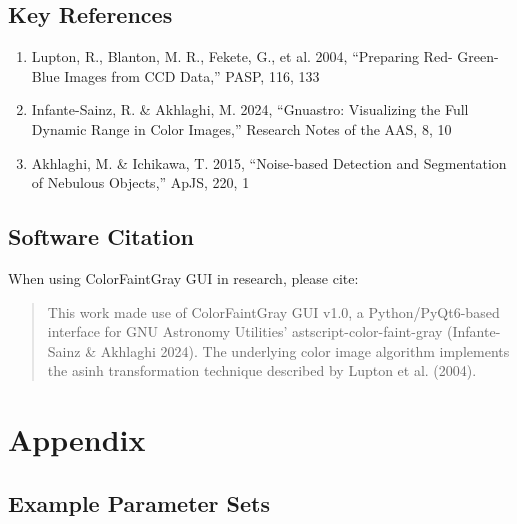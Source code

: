 \documentclass[11pt,a4paper]{article}
\begin{document}
\subsection{Key References}

\begin{enumerate}
\item Lupton, R., Blanton, M. R., Fekete, G., et al. 2004, ``Preparing Red-
Green-Blue Images from CCD Data,'' PASP, 116, 133
\item Infante-Sainz, R. \& Akhlaghi, M. 2024, ``Gnuastro: Visualizing the
Full Dynamic Range in Color Images,'' Research Notes of the AAS, 8, 10
\item Akhlaghi, M. \& Ichikawa, T. 2015, ``Noise-based Detection and
Segmentation of Nebulous Objects,'' ApJS, 220, 1
\end{enumerate}

\subsection{Software Citation}

When using ColorFaintGray GUI in research, please cite:

\begin{quote}
This work made use of ColorFaintGray GUI v1.0, a Python/PyQt6-based
interface for GNU Astronomy Utilities' astscript-color-faint-gray (Infante-
Sainz \& Akhlaghi 2024). The underlying color image algorithm implements the
asinh transformation technique described by Lupton et al. (2004).
\end{quote}

\section{Appendix}

\subsection{Example Parameter Sets}
\end{document}
